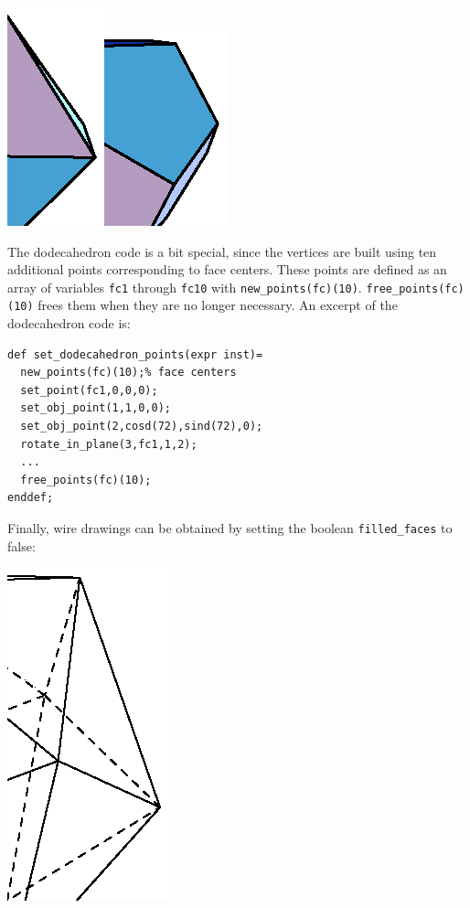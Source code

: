 \documentclass[nonumber,harvardcite]{ltugboat}
\begin{document}
\begin{center}
\includegraphics{octa.ps}\hfill\includegraphics{dodeca.ps}
\end{center}

The dodecahedron code is a bit special, since the vertices are built
using ten additional points corresponding to face centers. These points
are defined as an array of variables \verb|fc1| through \verb|fc10| 
with \verb|new_points(fc)(10)|. 
\verb|free_points(fc)(10)| frees them when they are no longer
necessary. An excerpt of the dodecahedron code is:

\begin{verbatim}
def set_dodecahedron_points(expr inst)=
  new_points(fc)(10);% face centers
  set_point(fc1,0,0,0);
  set_obj_point(1,1,0,0);
  set_obj_point(2,cosd(72),sind(72),0);
  rotate_in_plane(3,fc1,1,2);
  ...
  free_points(fc)(10);
enddef;
\end{verbatim}


Finally, wire drawings can be obtained by setting the boolean
\verb|filled_faces| to false:

\begin{center}
\includegraphics{icosa-w.ps}
\end{center}
\end{document}
